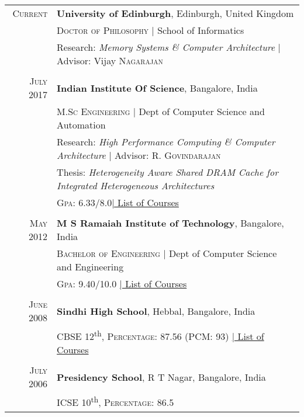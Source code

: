 \documentclass[a4paper,10pt]{article} %
\begin{document}
\begin{tabular}{rl}

\textsc{Current}  & \textbf{University of Edinburgh}, Edinburgh, United Kingdom\\
& \textsc{Doctor of Philosophy} | School of Informatics\\
& Research: \small\emph{Memory Systems \& Computer Architecture} | Advisor: Vijay \textsc{Nagarajan}\\
&\\



\textsc{July} 2017 & \textbf{Indian Institute Of Science}, Bangalore, India\\
& \textsc{M.Sc Engineering} | Dept of Computer Science and Automation\\
& Research: \small\emph{High Performance Computing \& Computer Architecture} | Advisor: R. \textsc{Govindarajan}\\
& Thesis: \small\emph{Heterogeneity Aware Shared DRAM Cache for Integrated Heterogeneous Architectures} \\
&\normalsize \textsc{Gpa}: 6.33/8.0\hyperlink{iisc}{\hfill | \footnotesize List of Courses}\\
&\\


\textsc{May} 2012 & \textbf{M S Ramaiah Institute of Technology}, Bangalore, India\\
& \textsc{Bachelor of Engineering} | Dept of Computer Science and Engineering \\
&\normalsize \textsc{Gpa}: 9.40/10.0 \hyperlink{msrit}{\hfill| \footnotesize List of Courses}\\
&\\


\textsc{June} 2008 & \textbf{Sindhi High School}, Hebbal, Bangalore, India\\
& \textsc{CBSE 12}\textsuperscript{th}, \normalsize \textsc{Percentage}: 87.56 (PCM: 93) \hyperlink{hs}{\hfill| \footnotesize List of Courses}\\
&\\


\textsc{July} 2006 & \textbf{Presidency School}, R T Nagar, Bangalore, India\\
& \textsc{ICSE 10}\textsuperscript{th}, \normalsize \textsc{Percentage}: 86.5 \\
\end{tabular}
\end{document}
